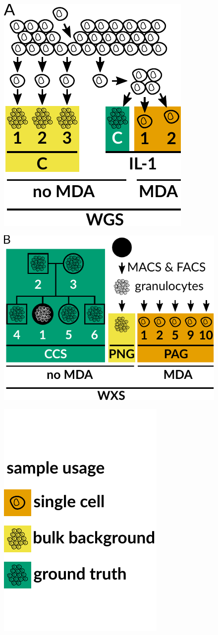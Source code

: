\documentclass[12pt,inline]{wlscirep}
\begin{document}
\begin{figure}[!tpb]
  \centering
  \begin{minipage}{.26\linewidth}
    \includegraphics[height=32ex]{figs/Dong2017_data_overview.pdf} \\
  \end{minipage}
  \hspace{4ex}
  \begin{minipage}{.4\linewidth}
    \includegraphics[height=32ex]{figs/Laehnemann2017_data_overview.pdf} \\
  \end{minipage}
  \hspace{4ex}
  \begin{minipage}{.22\linewidth}
    \includegraphics[height=32ex]{figs/data_overview_color_legend.pdf} \\

\end{minipage}
\end{figure}
\end{document}
